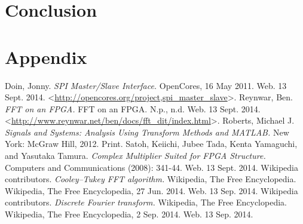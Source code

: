 \documentclass[12pt]{article}
\begin{document}
  \section*{Conclusion}

  \clearpage
  \section*{Appendix}

  \begin{thebibliography}{9}
      Doin, Jonny. \emph{SPI Master/Slave Interface.} OpenCores, 16 May 2011. Web. 13 Sept. 2014. \textless\url{http://opencores.org/project,spi_master_slave}\textgreater.
      Reynwar, Ben. \emph{FFT on an FPGA.} FFT on an FPGA. N.p., n.d. Web. 13 Sept. 2014. \textless\url{http://www.reynwar.net/ben/docs/fft_dit/index.html}\textgreater.
      Roberts, Michael J. \emph{Signals and Systems: Analysis Using Transform Methods and MATLAB.} New York: McGraw Hill, 2012. Print.
      Satoh, Keiichi, Jubee Tada, Kenta Yamaguchi, and Yasutaka Tamura. \emph{Complex Multiplier Suited for FPGA Structure.} Computers and Communications (2008): 341-44. Web. 13 Sept. 2014.
      Wikipedia contributors. \emph{Cooley–Tukey FFT algorithm.} Wikipedia, The Free Encyclopedia. Wikipedia, The Free Encyclopedia, 27 Jun. 2014. Web. 13 Sep. 2014.
      Wikipedia contributors. \emph{Discrete Fourier transform.} Wikipedia, The Free Encyclopedia. Wikipedia, The Free Encyclopedia, 2 Sep. 2014. Web. 13 Sep. 2014.
  \end{thebibliography}
\end{document}
